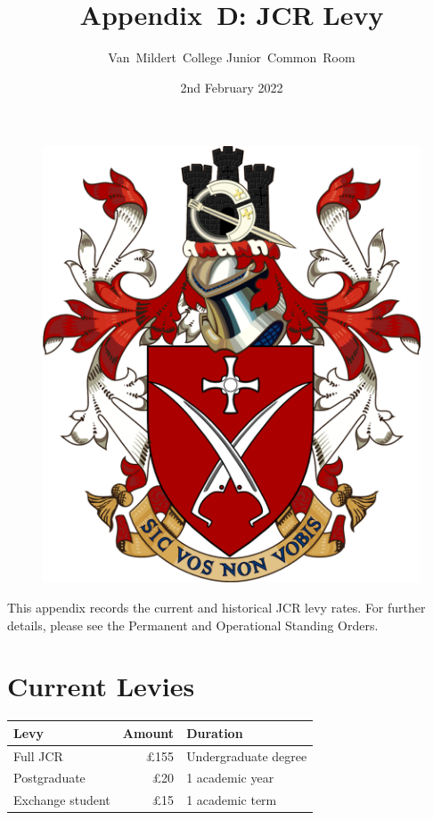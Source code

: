 \documentclass[12pt]{article}
\title{Appendix~D: JCR Levy}
\author{Van~Mildert~College Junior~Common~Room}
\date{2nd February 2022}
\begin{document}
\begin{titlepage}  %
    \maketitle
    \begin{figure}[h]
        \includegraphics[scale=0.25]{arms}  %
        \centering
    \end{figure}
    \thispagestyle{empty}
\end{titlepage}
\setcounter{page}{2}  %
This appendix records the current and historical JCR levy rates.
For further details, please see the Permanent and Operational Standing Orders.

\section{Current Levies}
\begin{center}
\begin{tabular}{|l|r|l|}\hline
    \textbf{Levy} & \textbf{Amount} & \textbf{Duration} \\\hline
    Full JCR & £155 & Undergraduate degree \\
    Postgraduate &  £20 & 1 academic year \\
    Exchange student & £15 & 1 academic term\\
    \hline
\end{tabular}
\end{center}
\end{document}
